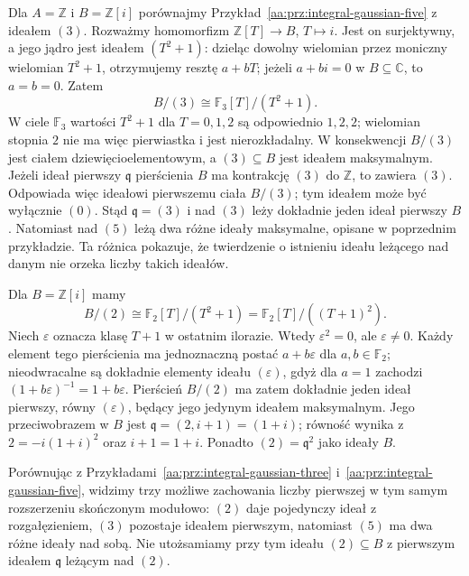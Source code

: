 \begin{przyklad}
\label{aa:prz:integral-gaussian-three}
Dla $A=\mathbb Z$ i $B=\mathbb Z[i]$ porównajmy
Przykład~\ref{aa:prz:integral-gaussian-five} z ideałem $(3)$.
Rozważmy homomorfizm $\mathbb Z[T]\to B$,
$T\mapsto i$. Jest on surjektywny, a jego jądro jest
ideałem $(T^2+1)$: dzieląc dowolny wielomian przez
moniczny wielomian $T^2+1$, otrzymujemy resztę $a+bT$;
jeżeli $a+bi=0$ w $B\subseteq\mathbb C$, to $a=b=0$.
Zatem
\[
 B/(3)\cong\mathbb F_3[T]/(T^2+1).
\]
W ciele $\mathbb F_3$ wartości $T^2+1$ dla
$T=0,1,2$ są odpowiednio $1,2,2$; wielomian stopnia
$2$ nie ma więc pierwiastka i jest nierozkładalny.
W konsekwencji $B/(3)$ jest ciałem dziewięcioelementowym,
a $(3)\subseteq B$ jest ideałem maksymalnym.
Jeżeli ideał pierwszy $\mathfrak q$ pierścienia $B$ ma
kontrakcję $(3)$ do $\mathbb Z$, to zawiera $(3)$.
Odpowiada więc ideałowi pierwszemu ciała $B/(3)$;
tym ideałem może być wyłącznie $(0)$. Stąd
$\mathfrak q=(3)$ i nad $(3)$ leży dokładnie jeden
ideał pierwszy $B$.
Natomiast nad $(5)$ leżą dwa różne ideały maksymalne,
opisane w poprzednim przykładzie. Ta różnica pokazuje,
że twierdzenie o istnieniu ideału leżącego nad danym
nie orzeka liczby takich ideałów.
\end{przyklad}
\begin{przyklad}
\label{aa:prz:integral-gaussian-two}
Dla $B=\mathbb Z[i]$ mamy
\[
 B/(2)\cong\mathbb F_2[T]/(T^2+1)
 =\mathbb F_2[T]/((T+1)^2).
\]
Niech $\varepsilon$ oznacza klasę $T+1$ w ostatnim ilorazie.
Wtedy $\varepsilon^2=0$, ale $\varepsilon\ne0$.
Każdy element tego pierścienia ma jednoznaczną postać
$a+b\varepsilon$ dla $a,b\in\mathbb F_2$;
nieodwracalne są dokładnie elementy ideału
$(\varepsilon)$, gdyż dla $a=1$ zachodzi
$(1+b\varepsilon)^{-1}=1+b\varepsilon$.
Pierścień $B/(2)$ ma zatem dokładnie jeden ideał pierwszy,
równy $(\varepsilon)$, będący jego jedynym ideałem maksymalnym.
Jego przeciwobrazem w $B$ jest
$\mathfrak q=(2,i+1)=(1+i)$; równość wynika z
$2=-i(1+i)^2$ oraz $i+1=1+i$.
Ponadto $(2)=\mathfrak q^2$ jako ideały $B$.

Porównując z Przykładami~\ref{aa:prz:integral-gaussian-three}
i~\ref{aa:prz:integral-gaussian-five}, widzimy trzy
możliwe zachowania liczby pierwszej w tym samym
rozszerzeniu skończonym modułowo:
$(2)$ daje pojedynczy ideał z rozgałęzieniem,
$(3)$ pozostaje ideałem pierwszym, natomiast
$(5)$ ma dwa różne ideały nad sobą.
Nie utożsamiamy przy tym ideału $(2)\subseteq B$
z pierwszym ideałem $\mathfrak q$ leżącym nad $(2)$.
\end{przyklad}

